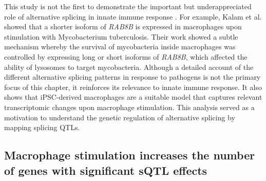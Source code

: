 This study is not the first to demonstrate the important but underappreciated role of alternative splicing in innate immune response \cite{Wagner2021-fl,Kalam2017-qa}. For example, Kalam et al. \cite{Kalam2017-qa} showed that a shorter isoform of \textit{RAB8B} is expressed in macrophages upon stimulation with Mycobacterium tuberculosis. Their work showed a subtle mechanism whereby the survival of mycobacteria inside macrophages was controlled by expressing long or short isoforms of \textit{RAB8B}, which affected the ability of lysosomes to target mycobacteria. Although a detailed account of the different alternative splicing patterns in response to pathogens is not the primary focus of this chapter, it reinforces its relevance to innate immune response. It also shows that iPSC-derived macrophages are a suitable model that captures relevant transcriptomic changes upon macrophage stimulation. This analysis served as a motivation to understand the genetic regulation of alternative splicing by mapping splicing QTLs.\\

\subsection{Macrophage stimulation increases the number of genes with significant sQTL effects }




